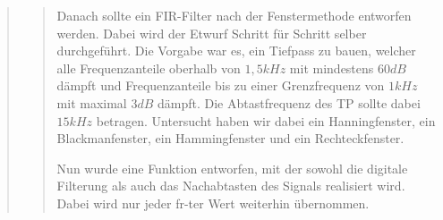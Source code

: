 \begin{quote}
\begin{quote}
    Danach sollte ein FIR-Filter nach der Fenstermethode entworfen werden. Dabei
    wird der Etwurf Schritt für Schritt selber durchgeführt. Die Vorgabe war es,
    ein Tiefpass zu bauen, welcher alle Frequenzanteile oberhalb von $1,5 kHz$
    mit mindestens $60 dB$ dämpft und Frequenzanteile bis zu einer Grenzfrequenz
    von $1 kHz$ mit maximal $3 dB$ dämpft. Die Abtastfrequenz des TP sollte
    dabei $15 kHz$ betragen. Untersucht haben wir dabei ein Hanningfenster, ein
    Blackmanfenster, ein Hammingfenster und ein Rechteckfenster.
    
            
            
            
            
            
    Nun wurde eine Funktion entworfen, mit der sowohl die digitale Filterung als
    auch das Nachabtasten des Signals realisiert wird. Dabei wird nur jeder
    fr-ter Wert weiterhin übernommen.  
	\end{quote}
\end{quote}

